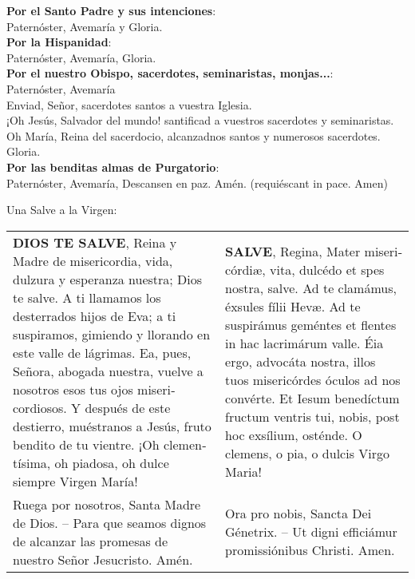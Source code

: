 \documentclass[./rosary.tex]{subfiles}
\begin{document}
\noindent\textbf{Por el Santo Padre y sus intenciones}:\\
{\indent}Paternóster, Avemaría y Gloria.\\
\noindent\textbf{Por la Hispanidad}:\\ 
{\indent}Paternóster, Avemaría, Gloria.\\
\noindent\textbf{Por el nuestro Obispo, sacerdotes, seminaristas, monjas...}:\\ 
{\indent}Paternóster, Avemaría\\
{\indent}Enviad, Señor, sacerdotes santos a vuestra Iglesia.\\
{\indent}¡Oh Jesús, Salvador del mundo! santificad a vuestros sacerdotes y seminaristas.\\
{\indent}Oh María, Reina del sacerdocio, alcanzadnos santos y numerosos sacerdotes.\\
{\indent}Gloria.\\
\noindent\textbf{Por las benditas almas de Purgatorio}:\\
{\indent}Paternóster, Avemaría, Descansen en paz. Amén. (requiéscant in pace. Amen)

\bigskip

Una Salve a la Virgen:
\begin{longtable} { p{} p{} }
\label{hailMaryQueen}
    \textbf{DIOS TE SALVE}, Reina y Madre de mi­se­ri­cordia, vida, dulzura y esperanza nuestra; Dios te salve.
    A ti llamamos los desterrados hijos de Eva; a ti suspiramos, gimiendo y llorando en este valle de lágrimas.
    Ea, pues, Señora, abogada nuestra, vuelve a nosotros esos tus ojos mi­se­ri­cordiosos. Y después de este destierro, muéstranos a Jesús,
    fruto bendito de tu vientre. ¡Oh cle­men­tísima, oh piadosa, oh dulce siempre Virgen María!
        &
    \textbf{SALVE}, Regina, Mater mi­se­ri­córdiæ, vita, dulcédo et spes nostra, salve. Ad te clamámus, éxsules fílii Hevæ.
    Ad te suspirámus geméntes et flentes in hac lacrimárum valle. Éia ergo, advocáta nostra, illos tuos mi­se­ri­córdes óculos ad nos convérte.
    Et Iesum benedíctum fructum ventris tui, nobis, post hoc exsílium, osténde. O clemens, o pia, o dulcis Virgo Maria!\\

    Ruega por nosotros, Santa Madre de Dios. -- Para que seamos dignos de alcanzar las promesas de nuestro Señor Jesucristo. Amén.                                           
        & 
    Ora pro nobis, Sancta Dei Génetrix. -- Ut digni efficiámur pro­mi­ssiónibus Christi. Amen.\\
\end{longtable}
\end{document}
